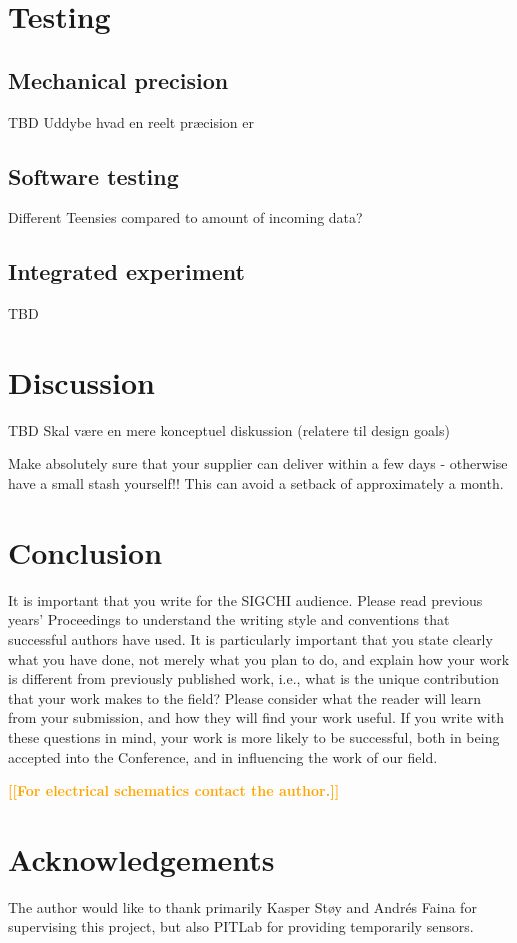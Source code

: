 \documentclass{sigchi}
\newcommand{\todo}[1]{\textsf{\textbf{\textcolor{Orange}{[[#1]]}}}}
\begin{document}
	\section{Testing}
	\subsection{Mechanical precision}
	TBD
	Uddybe hvad en reelt præcision er
	
	
	\subsection{Software testing}
	Different Teensies compared to amount of incoming data?
	
	
	
	\subsection{Integrated experiment}
	TBD
	
	\section{Discussion}
	TBD
	Skal være en mere konceptuel diskussion (relatere til design goals)
	
	
	Make absolutely sure that your supplier can deliver within a few days - otherwise have a small stash yourself!! This can avoid a setback of approximately a month.
	
	\section{Conclusion}
	It is important that you write for the SIGCHI audience.  Please read
	previous years' Proceedings to understand the writing style and
	conventions that successful authors have used.  It is particularly
	important that you state clearly what you have done, not merely what
	you plan to do, and explain how your work is different from previously
	published work, i.e., what is the unique contribution that your work
	makes to the field?  Please consider what the reader will learn from
	your submission, and how they will find your work useful.  If you
	write with these questions in mind, your work is more likely to be
	successful, both in being accepted into the Conference, and in
	influencing the work of our field.
	
	\todo{For electrical schematics contact the author.}
	
	\section{Acknowledgements}
	The author would like to thank primarily Kasper Støy and Andrés Faina for supervising this project, but also PITLab for providing temporarily sensors.
	
\end{document}
